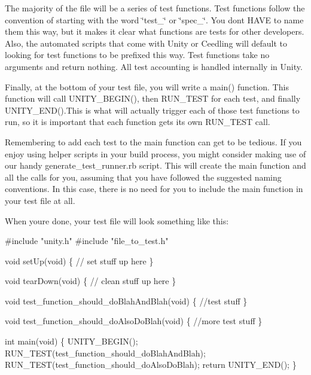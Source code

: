 The majority of the file will be a series of test functions. Test functions follow the convention of starting with the word \char`\"{}test\+\_\+\char`\"{} or \char`\"{}spec\+\_\+\char`\"{}. You don\textquotesingle{}t H\+A\+VE to name them this way, but it makes it clear what functions are tests for other developers. Also, the automated scripts that come with Unity or Ceedling will default to looking for test functions to be prefixed this way. Test functions take no arguments and return nothing. All test accounting is handled internally in Unity.

Finally, at the bottom of your test file, you will write a {\ttfamily main()} function. This function will call {\ttfamily U\+N\+I\+T\+Y\+\_\+\+B\+E\+G\+I\+N()}, then {\ttfamily R\+U\+N\+\_\+\+T\+E\+ST} for each test, and finally {\ttfamily U\+N\+I\+T\+Y\+\_\+\+E\+N\+D()}.This is what will actually trigger each of those test functions to run, so it is important that each function gets its own {\ttfamily R\+U\+N\+\_\+\+T\+E\+ST} call.

Remembering to add each test to the main function can get to be tedious. If you enjoy using helper scripts in your build process, you might consider making use of our handy generate\+\_\+test\+\_\+runner.\+rb script. This will create the main function and all the calls for you, assuming that you have followed the suggested naming conventions. In this case, there is no need for you to include the main function in your test file at all.

When you\textquotesingle{}re done, your test file will look something like this\+:


\begin{DoxyCode}
\textcolor{preprocessor}{#include "unity.h"}
\textcolor{preprocessor}{#include "file\_to\_test.h"}

\textcolor{keywordtype}{void} setUp(\textcolor{keywordtype}{void}) \{
    \textcolor{comment}{// set stuff up here}
\}

\textcolor{keywordtype}{void} tearDown(\textcolor{keywordtype}{void}) \{
    \textcolor{comment}{// clean stuff up here}
\}

\textcolor{keywordtype}{void} test\_function\_should\_doBlahAndBlah(\textcolor{keywordtype}{void}) \{
    \textcolor{comment}{//test stuff}
\}

\textcolor{keywordtype}{void} test\_function\_should\_doAlsoDoBlah(\textcolor{keywordtype}{void}) \{
    \textcolor{comment}{//more test stuff}
\}

\textcolor{keywordtype}{int} main(\textcolor{keywordtype}{void}) \{
    UNITY\_BEGIN();
    RUN\_TEST(test\_function\_should\_doBlahAndBlah);
    RUN\_TEST(test\_function\_should\_doAlsoDoBlah);
    \textcolor{keywordflow}{return} UNITY\_END();
\}
\end{DoxyCode}


